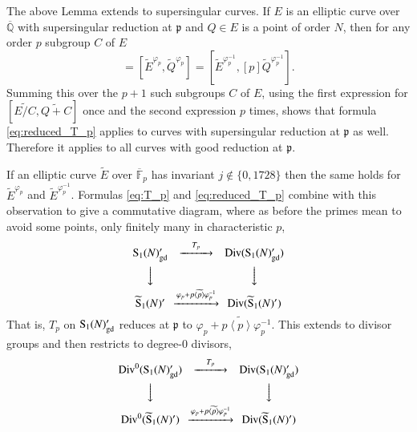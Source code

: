 The above Lemma extends to supersingular curves. If $E$ is an elliptic curve over $\overline{\mathbb{Q}}$ with supersingular
reduction at $\mathfrak{p}$ and $Q\in E$ is a point of order $N$, then for any order $p$ subgroup $C$ of $E$ 
\begin{equation*}
    [\widetilde{E/C},\widetilde{Q+C}]=[\widetilde{E}^{\varphi_p}, \widetilde{Q}^{\varphi_p}]=[\widetilde{E}^{\varphi_p^{-1}},[p]\widetilde{Q}^{\varphi_p^{-1}}].
\end{equation*}
Summing this over the $p+1$ such subgroups $C$ of $E$, using the first expression for $[\widetilde{E/C},\widetilde{Q+C}]$ 
once and the second expression $p$ times, shows that formula \ref{eq:reduced_T_p} applies to curves with supersingular
reduction at $\mathfrak{p}$ as well. Therefore it applies to all curves with good reduction at $\mathfrak{p}$.\par
If an elliptic curve $\widetilde{E}$ over $\overline{\mathbb{F}}_p$ has invariant $j\notin \{0,1728\}$ then the same
holds for $\widetilde{E}^{\varphi_p}$ and $\widetilde{E}^{\varphi_p^{-1}}$. Formulas \ref{eq:T_p} and \ref{eq:reduced_T_p}
combine with this observation to give a commutative diagram, where as before the primes mean to avoid some points,
only finitely many in characteristic $p$,
\begin{equation*}
    \begin{CD}
        {\rm S}_1(N)'_{\rm gd} @>T_p>> {\rm Div}({\rm S}_1(N)'_{\rm gd}) \\
        @VVV @VVV\\
        \widetilde{{\rm S}}_1(N)' @>\varphi_p+p\widetilde{\left\langle p \right\rangle }\varphi_p^{-1}>> {\rm Div}(\widetilde{{\rm S}}_1(N)')
    \end{CD}
\end{equation*}
That is, $T_p$ on ${\rm S}_1(N)'_{\rm gd}$ reduces at $\mathfrak{p}$ to $\varphi_p+p\widetilde{\left\langle p \right\rangle }\varphi_p^{-1}$.
This extends to divisor groups and then restricts to degree-0 divisors, 
\begin{equation}
    \begin{CD}
        {\rm Div}^0({\rm S}_1(N)'_{\rm gd}) @>T_p>> {\rm Div}({\rm S}_1(N)'_{\rm gd}) \\
        @VVV @VVV\\
        {\rm Div}^0(\widetilde{{\rm S}}_1(N)') @>\varphi_p+p\widetilde{\left\langle p \right\rangle }\varphi_p^{-1}>> {\rm Div}(\widetilde{{\rm S}}_1(N)')
    \end{CD}
    \label{cd:T_p_lemma}
\end{equation}
